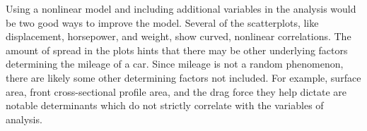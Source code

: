 \documentclass{article}
\begin{document}
Using a nonlinear model and including additional variables in the analysis would be two good ways to improve the model. Several of the scatterplots, like displacement, horsepower, and weight, show curved, nonlinear correlations. The amount of spread in the plots hints that there may be other underlying factors determining the mileage of a car. Since mileage is not a random phenomenon, there are likely some other determining factors not included. For example, surface area, front cross-sectional profile area, and the drag force they help dictate are notable determinants which do not strictly correlate with the variables of analysis.
\end{document}
